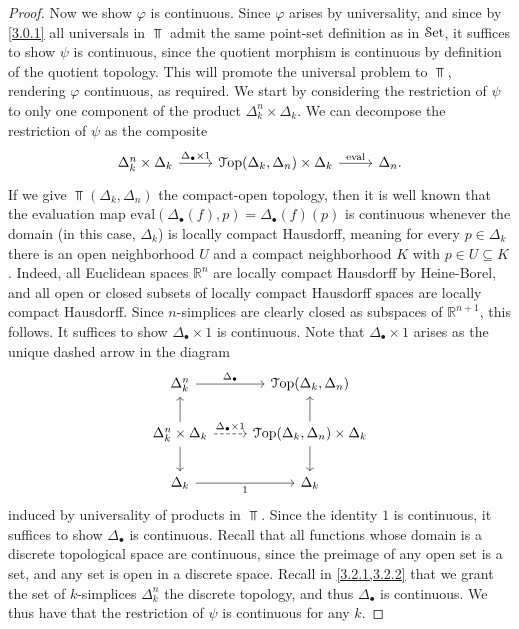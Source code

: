 \begin{proof}
    Now we show $\varphi$ is continuous. Since $\varphi$ arises by universality, and since by \cref{3.0.1} all universals in $\Top$ admit the same point-set definition as in $\mathcal{S}\mathrm{et}$, it suffices to show $\psi$ is continuous, since the quotient morphism is continuous by definition of the quotient topology. This will promote the universal problem to $\Top$, rendering $\varphi$ continuous, as required. We start by considering the restriction of $\psi$ to only one component of the product $\Delta_k^n\times\Delta_k$. We can decompose the restriction of $\psi$ as the composite
    \[\begin{tikzcd}
	{\Delta_k^n\times\Delta_k} & {\Top(\Delta_k,\Delta_n)\times\Delta_k} & {\Delta_n.}
	\arrow["{\Delta_\bullet\times1}", from=1-1, to=1-2]
	\arrow["{\mathrm{eval}}", from=1-2, to=1-3]
    \end{tikzcd}\]
    If we give $\Top(\Delta_k,\Delta_n)$ the compact-open topology, then it is well known that the evaluation map $\mathrm{eval}(\Delta_\bullet(f),p)=\Delta_\bullet(f)(p)$ is continuous whenever the domain (in this case, $\Delta_k$) is locally compact Hausdorff, meaning for every $p\in \Delta _k$ there is an open neighborhood $U$ and a compact neighborhood $K$ with $p\in U \subseteq K$. Indeed, all Euclidean spaces $\mathbb{R}^n$ are locally compact Hausdorff by Heine-Borel, and all open or closed subsets of locally compact Hausdorff spaces are locally compact Hausdorff. Since $n$-simplices are clearly closed as subspaces of $\mathbb{R}^{n+1}$, this follows. It suffices to show $\Delta_\bullet\times 1$ is continuous. Note that $\Delta_\bullet\times 1$ arises as the unique dashed arrow in the diagram
    \[\begin{tikzcd}
	{\Delta_k^n} & {\Top(\Delta_k,\Delta_n)} \\
	{\Delta_k^n\times\Delta_k} & {\Top(\Delta_k,\Delta_n)\times\Delta_k} \\
	{\Delta_k} & {\Delta_k}
	\arrow["{\Delta_\bullet}", from=1-1, to=1-2]
	\arrow[from=2-1, to=1-1]
	\arrow["{\Delta_\bullet\times1}", dashed, from=2-1, to=2-2]
	\arrow[from=2-1, to=3-1]
	\arrow[from=2-2, to=1-2]
	\arrow[from=2-2, to=3-2]
	\arrow["1"', from=3-1, to=3-2]
    \end{tikzcd}\]
    induced by universality of products in $\Top$. Since the identity $1$ is continuous, it suffices to show $\Delta_\bullet$ is continuous. Recall that all functions whose domain is a discrete topological space are continuous, since the preimage of any open set is a set, and any set is open in a discrete space. Recall in \cref{3.2.1,3.2.2} that we grant the set of $k$-simplices $\Delta_k^n$ the discrete topology, and thus $\Delta_\bullet$ is continuous. We thus have that the restriction of $\psi$ is continuous for any $k$.


\end{proof}
